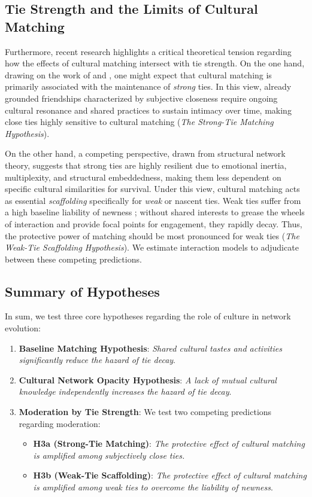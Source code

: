 \documentclass[
  letterpaper,
  DIV=11,
  numbers=noendperiod]{scrartcl}
\begin{document}
\subsection{Tie Strength and the Limits of Cultural Matching}\label{tie-strength-limits}

Furthermore, recent research highlights a critical theoretical tension regarding how the effects of cultural matching intersect with tie strength. On the one hand, drawing on the work of \citet{edelmann2014cultural-a77} and \citet{vaisey2010}, one might expect that cultural matching is primarily associated with the maintenance of \textit{strong} ties. In this view, already grounded friendships characterized by subjective closeness require ongoing cultural resonance and shared practices to sustain intimacy over time, making close ties highly sensitive to cultural matching (\textit{The Strong-Tie Matching Hypothesis}). 

On the other hand, a competing perspective, drawn from structural network theory, suggests that strong ties are highly resilient due to emotional inertia, multiplexity, and structural embeddedness, making them less dependent on specific cultural similarities for survival. Under this view, cultural matching acts as essential \textit{scaffolding} specifically for \textit{weak} or nascent ties. Weak ties suffer from a high baseline liability of newness \citep{burt2000}; without shared interests to grease the wheels of interaction and provide focal points for engagement, they rapidly decay. Thus, the protective power of matching should be most pronounced for weak ties (\textit{The Weak-Tie Scaffolding Hypothesis}). We estimate interaction models to adjudicate between these competing predictions.

\subsection{Summary of Hypotheses}\label{summary-of-hypotheses}

In sum, we test three core hypotheses regarding the role of culture in network evolution:
\begin{enumerate}
    \item \textbf{Baseline Matching Hypothesis}: \textit{Shared cultural tastes and activities significantly reduce the hazard of tie decay}.
    \item \textbf{Cultural Network Opacity Hypothesis}: \textit{A lack of mutual cultural knowledge independently increases the hazard of tie decay}.
    \item \textbf{Moderation by Tie Strength}: We test two competing predictions regarding moderation:
    \begin{itemize}
        \item \textbf{H3a (Strong-Tie Matching)}: \textit{The protective effect of cultural matching is amplified among subjectively close ties.}
        \item \textbf{H3b (Weak-Tie Scaffolding)}: \textit{The protective effect of cultural matching is amplified among weak ties to overcome the liability of newness}.
    \end{itemize}
\end{enumerate}
\end{document}
